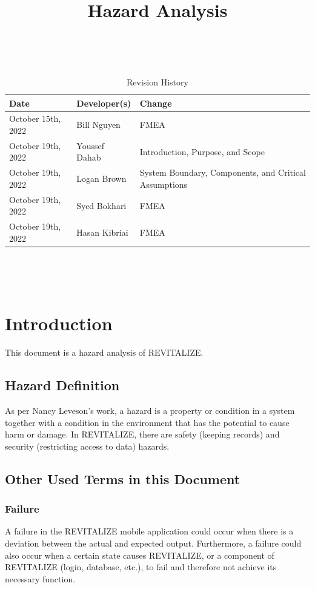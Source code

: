 \documentclass{article}
\title{Hazard Analysis\\\progname}
\author{\authname}
\date{}
\begin{document}
\maketitle
\thispagestyle{empty}

~\newpage


\begin{table}[hp]
	\caption{Revision History} \label{TblRevisionHistory}
	\begin{tabularx}{\textwidth}{llX}
		\toprule
		\textbf{Date} & \textbf{Developer(s)} & \textbf{Change}\\
		\midrule
		October 15th, 2022 & Bill Nguyen & FMEA \\
		October 19th, 2022 & Youssef Dahab & Introduction, Purpose, and Scope \\
        		October 19th, 2022 & Logan Brown & System Boundary, Components, and Critical Assumptions\\
		October 19th, 2022 & Syed Bokhari & FMEA\\
		October 19th, 2022 & Hasan Kibriai & FMEA\\
		\bottomrule
	\end{tabularx}
\end{table}

~\newpage

\tableofcontents

~\newpage


\section{Introduction}
This document is a hazard analysis of REVITALIZE.

\subsection{Hazard Definition}
As per Nancy Leveson's work, a hazard is a property or condition in a system together with a condition in the environment that has the potential to cause harm or damage. In REVITALIZE, there are safety (keeping records) and security (restricting access to data) hazards.

\subsection{Other Used Terms in this Document}

\subsubsection{Failure}
A failure in the REVITALIZE mobile application could occur when there is a deviation between the actual and expected output. Furthermore, a failure could also occur when a certain state causes REVITALIZE, or a component of REVITALIZE (login, database, etc.), to fail and therefore not achieve its necessary function.
\end{document}
